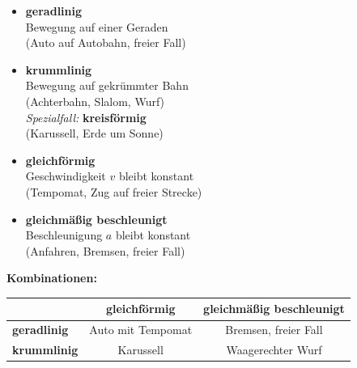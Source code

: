 \documentclass[11pt,a4paper]{article}
\begin{document}
\begin{minipage}[t]{0.48\textwidth}
\begin{tcolorbox}[colback=physikblue!10, colframe=physikblue, title=\textbf{1. Bahnform}]
\begin{itemize}[leftmargin=0.5cm]
\item \textbf{geradlinig}\\
{\small Bewegung auf einer Geraden}\\
{\small (Auto auf Autobahn, freier Fall)}
\item \textbf{krummlinig}\\
{\small Bewegung auf gekrümmter Bahn}\\
{\small (Achterbahn, Slalom, Wurf)}\\[0.3em]
\textit{Spezialfall:} \textbf{kreisförmig}\\
{\small (Karussell, Erde um Sonne)}
\end{itemize}
\end{tcolorbox}
\end{minipage}
\hfill
\begin{minipage}[t]{0.48\textwidth}
\begin{tcolorbox}[colback=merkegreen!10, colframe=merkegreen, title=\textbf{2. Bewegungsart}]
\begin{itemize}[leftmargin=0.5cm]
\item \textbf{gleichförmig}\\
{\small Geschwindigkeit $v$ bleibt konstant}\\
{\small (Tempomat, Zug auf freier Strecke)}
\item \textbf{gleichmäßig beschleunigt}\\
{\small Beschleunigung $a$ bleibt konstant}\\
{\small (Anfahren, Bremsen, freier Fall)}
\end{itemize}
\end{tcolorbox}
\end{minipage}

\vspace{0.5cm}

\begin{center}
\textbf{Kombinationen:}\\[0.3cm]
\begin{tabular}{|l|c|c|}
\hline
\rowcolor{lightblue}
& \textbf{gleichförmig} & \textbf{gleichmäßig beschleunigt} \\
\hline
\textbf{geradlinig} & Auto mit Tempomat & Bremsen, freier Fall \\
\hline
\textbf{krummlinig} & Karussell & Waagerechter Wurf \\
\hline
\end{tabular}
\end{center}
\end{document}
